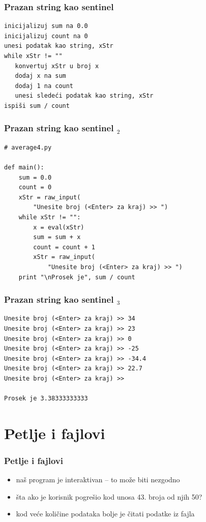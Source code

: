 \documentclass[utf8,compress]{beamer}
\begin{document}
\begin{frame}[fragile]
  \frametitle{Prazan string kao sentinel}
\begin{verbatim}
inicijalizuj sum na 0.0
inicijalizuj count na 0
unesi podatak kao string, xStr
while xStr != ""
   konvertuj xStr u broj x
   dodaj x na sum
   dodaj 1 na count
   unesi sledeći podatak kao string, xStr
ispiši sum / count
\end{verbatim}
\end{frame}

\begin{frame}[fragile]
  \frametitle{Prazan string kao sentinel $_2$}
\begin{verbatim}
# average4.py

def main():
    sum = 0.0
    count = 0
    xStr = raw_input(
        "Unesite broj (<Enter> za kraj) >> ")
    while xStr != "":
        x = eval(xStr)
        sum = sum + x
        count = count + 1
        xStr = raw_input(
            "Unesite broj (<Enter> za kraj) >> ")
    print "\nProsek je", sum / count
\end{verbatim}
\end{frame}

\begin{frame}[fragile]
  \frametitle{Prazan string kao sentinel $_3$}
\begin{verbatim}
Unesite broj (<Enter> za kraj) >> 34
Unesite broj (<Enter> za kraj) >> 23
Unesite broj (<Enter> za kraj) >> 0
Unesite broj (<Enter> za kraj) >> -25
Unesite broj (<Enter> za kraj) >> -34.4
Unesite broj (<Enter> za kraj) >> 22.7
Unesite broj (<Enter> za kraj) >>

Prosek je 3.38333333333
\end{verbatim}
\end{frame}

\section[Fajlovi]{Petlje i fajlovi}

\begin{frame}[fragile]
  \frametitle{Petlje i fajlovi}
  \begin{itemize}
    \item naš program je interaktivan -- to može biti nezgodno
    \item šta ako je korisnik pogrešio kod unosa 43. broja od njih 50?
    \item kod veće količine podataka bolje je čitati podatke iz fajla
  \end{itemize}
\end{frame}
\end{document}
